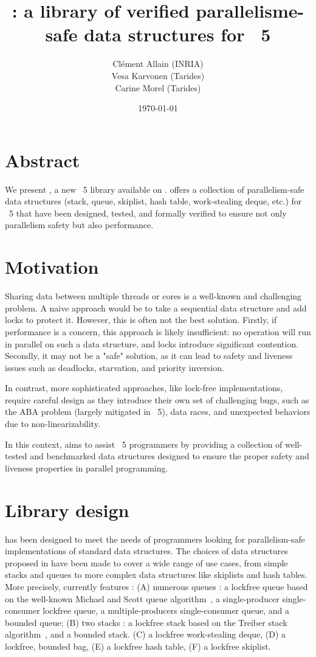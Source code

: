 \documentclass[a4paper, 11pt]{article}
\title{\Saturn: a library of verified parallelisme-safe data structures for \OCaml~5}
\date{\today}
\author{
  Clément Allain (INRIA) \\
  Vesa Karvonen (Tarides) \\
  Carine Morel (Tarides)
}
\begin{document}
\maketitle

\section{Abstract}
We present \Saturn, a new \OCaml~5 library available on \opam. \Saturn offers a collection of parallelism-safe data structures (stack, queue, skiplist, hash table, work-stealing deque, etc.) for \OCaml~5 that have been designed, tested, and formally verified to ensure not only parallelism safety but also performance.

\section{Motivation}

Sharing data between multiple threads or cores is a well-known and challenging problem. A naive approach would be to take a sequential data structure and add locks to protect it. However, this is often not the best solution. Firstly, if performance is a concern, this approach is likely insufficient: no operation will run in parallel on such a data structure, and locks introduce significant contention. Secondly, it may not be a "safe" solution, as it can lead to safety and liveness issues such as deadlocks, starvation, and priority inversion.

In contrast, more sophisticated approaches, like lock-free implementations, require careful design as they introduce their own set of challenging bugs, such as the ABA problem (largely mitigated in \OCaml~5), data races, and unexpected behaviors due to non-linearizability.

In this context, \Saturn aims to assist \OCaml~5 programmers by providing a collection of well-tested and benchmarked data structures designed to ensure the proper safety and liveness properties in parallel programming.

\section{Library design}

\Saturn has been designed to meet the needs of programmers looking for parallelism-safe implementations of standard data structures. The choices of data structures proposed in have been made to cover a wide range of use cases, from simple stacks and queues to more complex data structures like skiplists and hash tables.  More precisely, \Saturn currently features : 
(A) numerous queues : a lockfree queue based on the well-known Michael and Scott queue algorithm~\cite{michael1996simple}, a single-producer single-consumer lockfree queue, a multiple-producers single-consumer queue, and a bounded queue; 
(B) two stacks : a lockfree stack based on the Treiber stack algorithm~\cite{treiber1986systems}, and a bounded stack. %
(C) a lockfree work-stealing deque,
(D) a lockfree, bounded bag,
(E) a lockfree hash table, 
(F) a lockfree skiplist.
\end{document}
